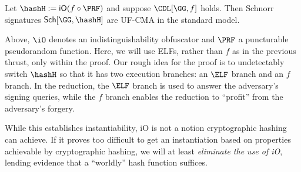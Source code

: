 \begin{conj}
        Let $\hashH := \mathsf{iO} (f \circ \PRF)$ and suppose $\CDL[\GG,f]$ holds. Then Schnorr signatures $\mathsf{Sch}[\GG,\hashH]$ are UF-CMA in the standard model.
\end{conj}
Above, $\iO$ denotes an indistinguishability obfuscator and $\PRF$ a puncturable pseudorandom function. Here, we will use ELFs, rather than $f$ as in the previous thrust, only within the proof. Our rough idea for the proof is to undetectably switch $\hashH$ so that it has two execution branches: an $\ELF$ branch and an $f$ branch. In the reduction, the $\ELF$ branch is used to answer the adversary's signing queries, while the $f$ branch enables the reduction to ``profit'' from the adversary's forgery.

While this  establishes instantiability, iO is not a notion  cryptographic hashing can achieve. If it proves too difficult to  get an instantiation   based on properties achievable by cryptographic hashing, we will at least  \emph{eliminate the use of iO}, lending evidence that a ``worldly'' hash function suffices.   %

